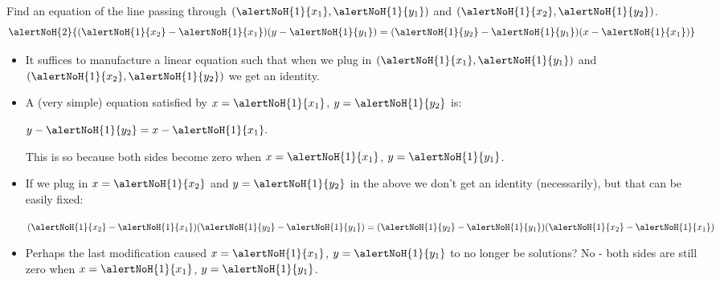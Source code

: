 \begin{frame}
\begin{example}
Find an equation of the line passing through $(\alertNoH{1}{x_1},\alertNoH{1}{y_1})$ and $(\alertNoH{1}{x_2}, \alertNoH{1}{y_2})$.
\[
\alertNoH{2}{(\alertNoH{1}{x_2}-\alertNoH{1}{x_1})(y-\alertNoH{1}{y_1})=(\alertNoH{1}{y_2}-\alertNoH{1}{y_1})(x-\alertNoH{1}{x_1})}
\]
\begin{itemize}

\item It suffices to manufacture a linear equation such that when we plug in $(\alertNoH{1}{x_1},\alertNoH{1}{y_1})$ and $(\alertNoH{1}{x_2},\alertNoH{1}{y_2})$ we get an identity.
\item A (very simple) equation satisfied by $x=\alertNoH{1}{x_1}$, $ y=\alertNoH{1}{y_2}$ is:

\hfil \hfil$
y-\alertNoH{1}{y_2}=x-\alertNoH{1}{x_1}.
$

This is so because both sides become zero when $x=\alertNoH{1}{x_1}$, $y=\alertNoH{1}{y_1}$.
\item If we plug in $x=\alertNoH{1}{x_2}$ and $y=\alertNoH{1}{y_2}$ in the above we don't get an identity (necessarily), but that can be easily fixed:

\hfil \hfil $
(\alertNoH{1}{x_2}-\alertNoH{1}{x_1} )(\alertNoH{1}{y_2}- \alertNoH{1}{ y_1 } )= ( \alertNoH{1}{y_2}-\alertNoH{1}{y_1}) (\alertNoH{1}{x_2} - \alertNoH{1}{ x_1}) 
$
\item Perhaps the last modification caused $x=\alertNoH{1}{x_1}$, $y=\alertNoH{1}{y_1}$ to no longer be solutions? No - both sides are still zero when $x=\alertNoH{1}{x_1}$, $y=\alertNoH{1}{y_1}$.
\end{itemize}
\end{example}
\end{frame}
